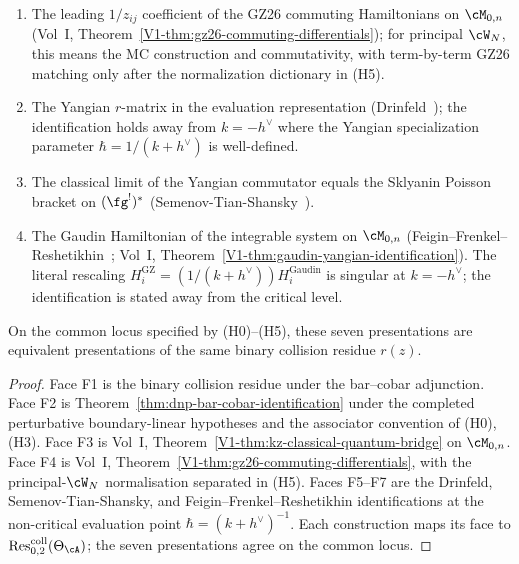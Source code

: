 \begin{theorem}
\begin{enumerate}[label=\textup{(F\arabic*)}]
 over $\cM_{0,n}$.
\item The leading $1/z_{ij}$ coefficient of the GZ26 commuting
 Hamiltonians on $\cM_{0,n}$
 \textup{(}Vol~I, Theorem~\textup{\ref{V1-thm:gz26-commuting-differentials}}\textup{)};
 for principal $\cW_N$, this means the MC construction and
 commutativity, with term-by-term GZ26 matching only after the
 normalization dictionary in \textup{(}H5\textup{)}.
\item The Yangian $r$-matrix in the evaluation representation
 \textup{(}Drinfeld~\cite{Drinfeld85}\textup{)}; the identification
 holds away from $k = -h^\vee$ where the Yangian specialization
 parameter $\hbar = 1/(k + h^\vee)$ is well-defined.
\item The classical limit of the Yangian commutator equals the Sklyanin
 Poisson bracket on $(\fg^!)^*$
 \textup{(}Semenov-Tian-Shansky~\cite{STS83}\textup{)}.
\item The Gaudin Hamiltonian of the integrable system on $\cM_{0,n}$
 \textup{(}Feigin--Frenkel--Reshetikhin~\cite{FFR94};
 Vol~I, Theorem~\textup{\ref{V1-thm:gaudin-yangian-identification}}\textup{)}.
 The literal rescaling $H_i^{\mathrm{GZ}} = (1/(k+h^\vee))
 H_i^{\mathrm{Gaudin}}$ is singular at $k = -h^\vee$; the
 identification is stated away from the critical level.
\end{enumerate}
On the common locus specified by \textup{(H0)--(H5)}, these seven
presentations are equivalent presentations of the same binary collision
residue $r(z)$.
\end{theorem}

\begin{proof}
Face F1 is the binary collision residue under the bar--cobar
adjunction. Face F2 is
Theorem~\ref{thm:dnp-bar-cobar-identification} under the completed
perturbative boundary-linear hypotheses and the associator
convention of (H0), (H3). Face F3 is Vol~I,
Theorem~\ref{V1-thm:kz-classical-quantum-bridge} on $\cM_{0,n}$.
Face F4 is Vol~I,
Theorem~\ref{V1-thm:gz26-commuting-differentials}, with the
principal-$\cW_N$ normalisation separated in (H5). Faces F5--F7
are the Drinfeld, Semenov-Tian-Shansky, and
Feigin--Frenkel--Reshetikhin identifications at the non-critical
evaluation point $\hbar=(k+h^\vee)^{-1}$. Each construction maps
its face to $\operatorname{Res}^{\mathrm{coll}}_{0,2}(\Theta_\cA)$;
the seven presentations agree on the common locus.
\end{proof}

